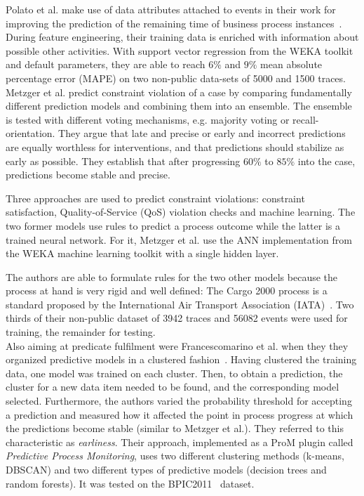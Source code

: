 Polato et al. make use of data attributes attached to events in their work for improving the prediction of the remaining time of business process instances~\cite{polato2014}. During feature engineering, their training data is enriched with information about possible other activities. With support vector regression from the WEKA toolkit~\cite{web:weka} and default parameters, they are able to reach $6\%$ and $9\%$ mean absolute percentage error (MAPE) on two non-public data-sets of 5000 and 1500 traces.\\

Metzger et al. predict constraint violation of a case by comparing fundamentally different prediction models and combining them into an ensemble. The ensemble is tested with different voting mechanisms, e.g. majority voting or recall-orientation. They argue that late and precise or early and incorrect predictions are equally worthless for interventions, and that predictions should stabilize as early as possible. They establish that after progressing $60\%$ to $85\%$ into the case, predictions become stable and precise.

Three approaches are used to predict constraint violations: constraint satisfaction, Quality-of-Service (QoS) violation checks and machine learning. The two former models use rules to predict a process outcome while the latter is a trained neural network. For it, Metzger et al. use the ANN implementation from the WEKA machine learning toolkit with a single hidden layer.

The authors are able to formulate rules for the two other models because the process at hand is very rigid and well defined: The Cargo 2000 process is a standard proposed by the International Air Transport Association (IATA)~\cite{metzger2015}. Two thirds of their non-public dataset of 3942 traces and 56082 events were used for training, the remainder for testing.\\

Also aiming at predicate fulfilment were Francescomarino et al. when they they organized predictive models in a clustered fashion~\cite{francescomarino2015}. Having clustered the training data, one model was trained on each cluster. Then, to obtain a prediction, the cluster for a new data item needed to be found, and the corresponding model selected. Furthermore, the authors varied the probability threshold for accepting a prediction and measured how it affected the point in process progress at which the predictions become stable (similar to Metzger et al.). They referred to this characteristic as \textit{earliness}. Their approach, implemented as a ProM plugin called \textit{Predictive Process Monitoring}, uses two different clustering methods (k-means, DBSCAN) and two different types of predictive models (decision trees and random forests). It was tested on the BPIC2011~\cite{BPIC2011} dataset.

